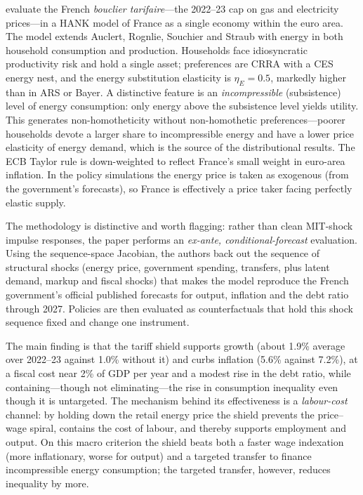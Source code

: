 \documentclass[11pt,a4paper]{article}
\begin{document}
\citet{Langot2026} evaluate the French \emph{bouclier tarifaire}---the 2022--23
cap on gas and electricity prices---in a HANK model of France as a single
economy within the euro area. The model extends Auclert, Rognlie, Souchier and
Straub with energy in both household consumption and production. Households face
idiosyncratic productivity risk and hold a single asset; preferences are CRRA
with a CES energy nest, and the energy substitution elasticity is $\eta_E=0.5$,
markedly higher than in ARS or Bayer. A distinctive feature is an
\emph{incompressible} (subsistence) level of energy consumption: only energy
above the subsistence level yields utility. This generates non-homotheticity
without non-homothetic preferences---poorer households devote a larger share to
incompressible energy and have a lower price elasticity of energy demand, which
is the source of the distributional results. The ECB Taylor rule is
down-weighted to reflect France's small weight in euro-area inflation. In the
policy simulations the energy price is taken as exogenous (from the
government's forecasts), so France is effectively a price taker facing
perfectly elastic supply.

The methodology is distinctive and worth flagging: rather than clean MIT-shock
impulse responses, the paper performs an \emph{ex-ante, conditional-forecast}
evaluation. Using the sequence-space Jacobian, the authors back out the
sequence of structural shocks (energy price, government spending, transfers,
plus latent demand, markup and fiscal shocks) that makes the model reproduce
the French government's official published forecasts for output, inflation and
the debt ratio through 2027. Policies are then evaluated as counterfactuals
that hold this shock sequence fixed and change one instrument.

The main finding is that the tariff shield supports growth (about 1.9\% average
over 2022--23 against 1.0\% without it) and curbs inflation (5.6\% against
7.2\%), at a fiscal cost near 2\% of GDP per year and a modest rise in the debt
ratio, while containing---though not eliminating---the rise in consumption
inequality even though it is untargeted. The mechanism behind its effectiveness
is a \emph{labour-cost} channel: by holding down the retail energy price the
shield prevents the price--wage spiral, contains the cost of labour, and
thereby supports employment and output. On this macro criterion the shield
beats both a faster wage indexation (more inflationary, worse for output) and a
targeted transfer to finance incompressible energy consumption; the targeted
transfer, however, reduces inequality by more.
\end{document}

